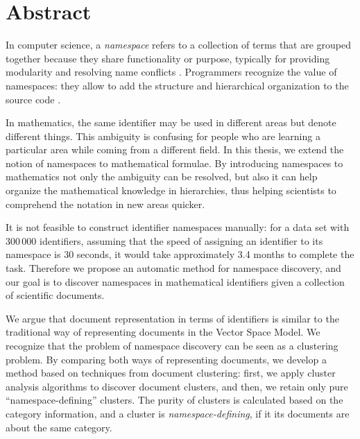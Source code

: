 \section*{Abstract}

In computer science, a \emph{namespace} refers to a collection of
terms that are grouped together because they share functionality or
purpose, typically for providing modularity and resolving name conflicts
\cite{duval2002metadata}.
Programmers recognize the value of namespaces: they allow to 
add the structure and hierarchical organization to the source code
\cite{mcarthur2008php6}. 

In mathematics, the same identifier may be used in different areas
but denote different things. 
This ambiguity is confusing for people who are learning a particular 
area while coming from a different field.
In this thesis, we extend the notion of namespaces to mathematical formulae.
By introducing namespaces to mathematics not only the ambiguity can be resolved, 
but also it can help organize the mathematical knowledge in hierarchies,
thus helping scientists to comprehend the notation in new areas quicker. 

It is not feasible to construct identifier namespaces manually:
for a data set with 300\,000 identifiers, assuming that the speed of 
assigning an identifier to its namespace is 30 seconds,
it would take approximately 3.4 months to complete the task.
Therefore we propose an automatic method for namespace discovery, and our goal 
is to discover namespaces in mathematical identifiers given a collection of scientific 
documents.

We argue that document representation in terms of identifiers is similar to the 
traditional way of representing documents in the Vector Space Model. We recognize 
that the problem of namespace discovery can be seen as a clustering problem.
By comparing both ways of representing documents, we develop a method based 
on techniques from document clustering: first, we apply cluster analysis algorithms 
to discover document clusters, and then, we retain only pure ``namespace-defining'' clusters.
The purity of clusters is calculated based on the category information, and a 
cluster is \emph{namespace-defining}, if it its documents are about the same category. 

